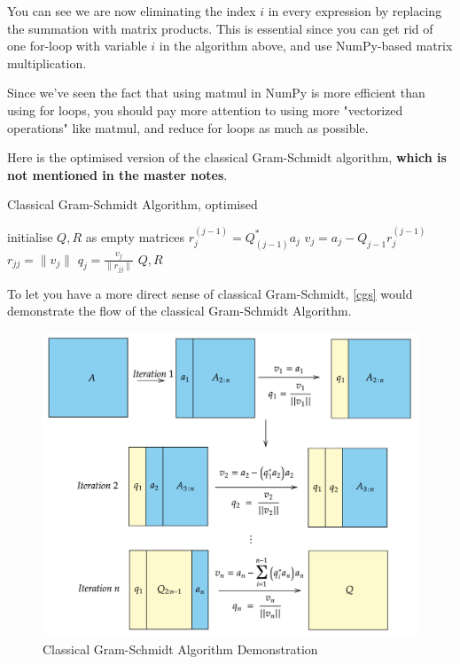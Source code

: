 \noindent 
You can see we are now eliminating the index \(i\) in every expression by replacing the summation with matrix products. This is essential since you can get rid of one for-loop with variable \(i\)  in the algorithm above, and use NumPy-based matrix multiplication. \medskip

\noindent Since we've seen the fact that using matmul in NumPy is more efficient than using for loops, you should pay more attention to using more "vectorized operations" like matmul, and reduce for loops as much as possible. \medskip

\noindent Here is the optimised version of the classical Gram-Schmidt algorithm, \textbf{which is not mentioned in the master notes}.
\begin{algorithm}
  \caption{Classical Gram-Schmidt Algorithm, optimised}
  \begin{algorithmic}[1]
    \State initialise \(Q, R\)  as empty matrices
      \State \(r_j^{(j - 1)} = Q_{(j - 1)}^{*}a_j\)
      \State \(v_j = a_j - Q_{j - 1}r_j^{(j - 1)}\)
      \State \(r_{jj} = \|v_j\|\)
      \State \(q_j = \frac{v_j}{\|r_{jj}\|}\)    
    \EndFor
    \State \Return \(Q, R\) 
  \EndProcedure
  \end{algorithmic}
\end{algorithm}

\newpage
\noindent To let you have a more direct sense of classical Gram-Schmidt, \autoref{cgs} would demonstrate the flow of the classical Gram-Schmidt Algorithm. 
\begin{figure}[htp]
  \centering
  \includegraphics[width=\textwidth]{imgs/cgs.png}
  \caption{Classical Gram-Schmidt Algorithm Demonstration}
  \label{cgs}
\end{figure}

